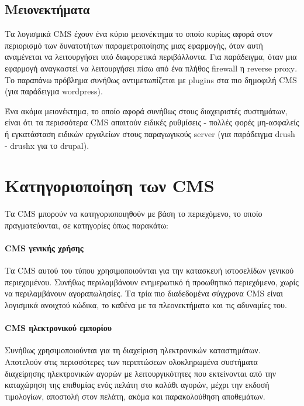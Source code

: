 \documentclass[12pt]{report}
\begin{document}
\subsection{Μειονεκτήματα}
Τα λογισμικά \textlatin{CMS} έχουν ένα κύριο μειονέκτημα το οποίο κυρίως αφορά στον περιορισμό των δυνατοτήτων παραμετροποίησης μιας εφαρμογής, όταν αυτή αναμένεται να λειτουργήσει υπό διαφορετικά περιβάλλοντα. Για παράδειγμα, όταν μια εφαρμογή αναγκαστεί να λειτουργήσει πίσω από ένα πλήθος \textlatin{firewall} η \textlatin{reverse proxy}. Το παραπάνω πρόβλημα συνήθως αντιμετωπίζεται με \textlatin{plugins} στα πιο δημοφιλή \textlatin{CMS} (για παράδειγμα \textlatin{wordpress}).

Ένα ακόμα μειονέκτημα, το οποίο αφορά συνήθως στους διαχειριστές συστημάτων, είναι ότι τα περισσότερα \textlatin{CMS} απαιτούν ειδικές ρυθμίσεις - πολλές φορές μη-ασφαλείς ή εγκατάσταση ειδικών εργαλείων στους παραγωγικούς \textlatin{server} (για παράδειγμα \textlatin{drush - drushx} για το \textlatin{drupal}).

\section{Κατηγοριοποίηση των \textlatin{CMS}}
Τα \textlatin{CMS} μπορούν να κατηγοριοποιηθούν με βάση το περιεχόμενο, το οποίο πραγματεύονται, σε κατηγορίες όπως παρακάτω:

\paragraph{\textlatin{CMS} γενικής χρήσης} Τα \textlatin{CMS} αυτού του τύπου χρησιμοποιούνται για την κατασκευή ιστοσελίδων γενικού περιεχομένου. Συνήθως περιλαμβάνουν ενημερωτικό ή προωθητικό περιεχόμενο, χωρίς να περιλαμβάνουν αγοραπωλησίες. Τα τρία πιο διαδεδομένα σύγχρονα \textlatin{CMS} είναι λογισμικά ανοιχτού κώδικα, το καθένα με τα πλεονεκτήματα και τις αδυναμίες του.

\paragraph{\textlatin{CMS} ηλεκτρονικού εμπορίου} Συνήθως χρησιμοποιούνται για τη διαχείριση ηλεκτρονικών καταστημάτων. Αποτελούν στις περισσότερες των περιπτώσεων ολοκληρωμένα συστήματα διαχείρησης ηλεκτρονικών αγορών με λειτουργικότητες που εκτείνονται από την καταχώρηση της επιθυμίας ενός πελάτη στο καλάθι αγορών, μέχρι την εκδοσή τιμολογίων, αποστολή στον πελάτη, ακόμα και παρακολούθηση αποθεμάτων.
\end{document}
